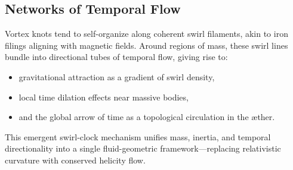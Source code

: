 \subsection*{Networks of Temporal Flow}

Vortex knots tend to self-organize along coherent swirl filaments, akin to iron filings aligning with magnetic fields. Around regions of mass, these swirl lines bundle into directional tubes of temporal flow, giving rise to:
\begin{itemize}
    \item gravitational attraction as a gradient of swirl density,
    \item local time dilation effects near massive bodies,
    \item and the global arrow of time as a topological circulation in the æther.
\end{itemize}

This emergent swirl-clock mechanism unifies mass, inertia, and temporal directionality into a single fluid-geometric framework—replacing relativistic curvature with conserved helicity flow.

